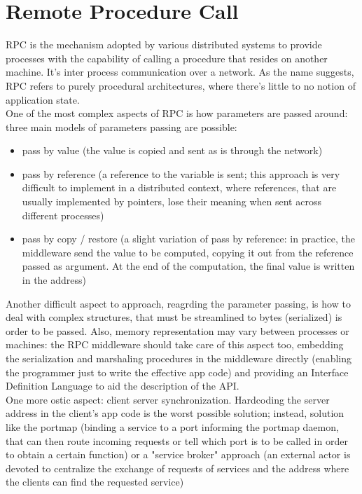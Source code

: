 \documentclass[10pt,a4paper]{article}
\begin{document}
		\section{Remote Procedure Call}
			RPC is the mechanism adopted by various distributed systems to provide processes with the capability of calling a procedure that resides on another machine. It's inter process communication over a network. As the name suggests, RPC refers to purely procedural architectures, where there's little to no notion of application state.\\
			One of the most complex aspects of RPC is how parameters are passed around: three main models of parameters passing are possible:
			\begin{itemize}
				\item pass by value (the value is copied and sent as is through the network)
				\item pass by reference (a reference to the variable is sent; this approach is very difficult to implement in a distributed context, where references, that are usually implemented by pointers, lose their meaning when sent across different processes)
				\item pass by copy / restore (a slight variation of pass by reference: in practice, the middleware send the value to be computed, copying it out from the reference passed as argument. At the end of the computation, the final value is written in the address)
			\end{itemize}
			Another difficult aspect to approach, reagrding the parameter passing, is how to deal with complex structures, that must be streamlined to bytes (serialized) is order to be passed. Also, memory representation may vary between processes or machines: the RPC middleware should take care of this aspect too, embedding the serialization and marshaling procedures in the middleware directly (enabling the programmer just to write the effective app code) and providing an Interface Definition Language to aid the description of the API.\\
			One more ostic aspect: client server synchronization. Hardcoding the server address in the client's app code is the worst possible solution; instead, solution like the portmap (binding a service to a port informing the portmap daemon, that can then route incoming requests or tell which port is to be called in order to obtain a certain function) or a "service broker" approach (an external actor is devoted to centralize the exchange of requests of services and the address where the clients can find the requested service)
			
\end{document}
